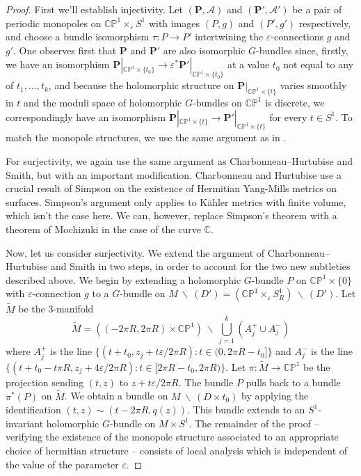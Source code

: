 \documentclass[11pt, oneside, reqno]{amsart}
\theoremstyle{definition} \newtheorem{definition}{Definition}[section]
\theoremstyle{definition} \newtheorem{remark}[definition]{Remark}
\theoremstyle{definition} \newtheorem{remarks}[definition]{Remarks}
\theoremstyle{definition} \newtheorem{question}[definition]{Question}
\theoremstyle{definition} \newtheorem*{note}{Note}
\theoremstyle{definition} \newtheorem{example}[definition]{Example}
\theoremstyle{definition} \newtheorem{examples}[definition]{Examples}
\newcommand{\bb}[1]{\mathbb{#1}}
\newcommand{\mc}[1]{\mathcal{#1}}
\newcommand{\wt}[1]{\widetilde{#1}}
\newcommand{\bo}[1]{\boldsymbol{#1}}
\newcommand{\bs}{\ \backslash \ }
\newcommand{\CC}{\mathbb{C}}
\newcommand{\eps}{\varepsilon}
\begin{document}
\begin{proof}
First we'll establish injectivity.  Let $(\bo P, \mc A)$ and $(\bo P', \mc A')$ be a pair of periodic monopoles on $\bb{CP}^1 \times_\eps S^1$ with images $(P,g)$ and $(P', g')$ respectively, and choose a bundle isomorphism $\tau \colon P \to P'$ intertwining the $\eps$-connections $g$ and $g'$.  One observes first that $\bo P$ and $\bo P'$ are also isomorphic $G$-bundles since, firstly, we have an isomorphism $\bo P|_{\bb{CP}^1 \times \{t_0\}} \to \eps^*\bo P'|_{\bb{CP}^1 \times \{t_0\}}$ at a value $t_0$ not equal to any of $t_1, \ldots, t_k$, and because the holomorphic structure on $\bo P|_{\bb{CP}^1 \times \{t\}}$ varies smoothly in $t$ and the moduli space of holomorphic $G$-bundles on $\bb{CP}^1$ is discrete, we correspondingly have an isomorphism $\bo P|_{\bb{CP}^1 \times \{t\}} \to \bo P'|_{\bb{CP}^1 \times \{t\}}$ for every $t \in S^1$.  To match the monopole structures, we use the same argument as in \cite[Proposition 5.6]{Smith}.

For surjectivity, we again use the same argument as Charbonneau--Hurtubise and Smith, but with an important modification.  Charbonneau and Hurtubise use a crucial result of Simpson \cite[Theorem 1]{Simpson} on the existence of Hermitian Yang-Mills metrics on surfaces.  Simpson's argument only applies to K\"ahler metrics with finite volume, which isn't the case here.  We can, however, replace Simpson's theorem with a theorem of Mochizuki \cite[Corollary 3.13]{MochizukiKH} in the case of the curve $\CC$.

Now, let us consider surjectivity.  We extend the argument of Charbonneau--Hurtubise and Smith in two steps, in order to account for the two new subtleties described above.  We begin by extending a holomorphic $G$-bundle $P$ on $\bb{CP}^1 \times \{0\}$ with $\eps$-connection $g$ to a $G$-bundle on $M \bs (D') = (\bb{CP}^1 \times_\eps S^1_R) \bs (D')$.  Let $\wt M$ be the 3-manifold
\[\wt M = ((-2\pi R, 2\pi R) \times \bb{CP}^1) \bs \bigcup_{j=1}^k (A^+_j \cup A^-_j)\]
where $A^+_j$ is the line $\{(t+ t_0,z_j + t \eps/{2\pi R}) \colon t \in (0, 2\pi R - t_0]\}$ and $A^-_j$ is the line $\{(t + t_0 - t \pi R,z_j + 4 \eps/{2\pi R}) \colon t \in [2\pi R-t_0, 2 \pi R)\}$.
Let $\pi \colon \wt M \to \bb{CP}^1$ be the projection sending $(t,z)$ to $z + t\eps/2 \pi R$. The bundle $P$ pulls back to a bundle $\pi^*(P)$ on $\wt M$. We obtain a bundle on $M \bs (D \times t_0)$ by applying the identification $(t,z) \sim (t - 2 \pi R, q(z))$. This bundle extends to an $S^1$-invariant holomorphic $G$-bundle on $M \times S^1$. The remainder of the proof -- verifying the existence of the monopole structure associated to an appropriate choice of hermitian structure -- consists of local analysis which is independent of the value of the parameter $\eps$. 


\end{proof}
\end{document}
